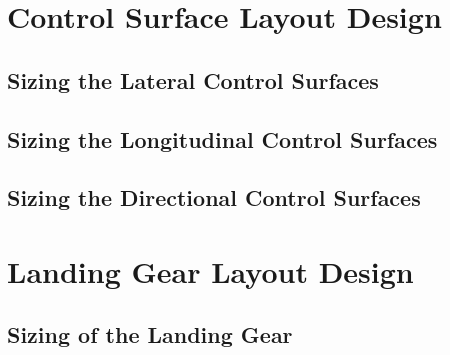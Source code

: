 \documentclass[conf]{new-aiaa}
\begin{document}
\section{Control Surface Layout Design}
\subsection{Sizing the Lateral Control Surfaces}
\subsection{Sizing the Longitudinal Control Surfaces}
\subsection{Sizing the Directional Control Surfaces}

\section{Landing Gear Layout Design}
\subsection{Sizing of the Landing Gear}
\end{document}
